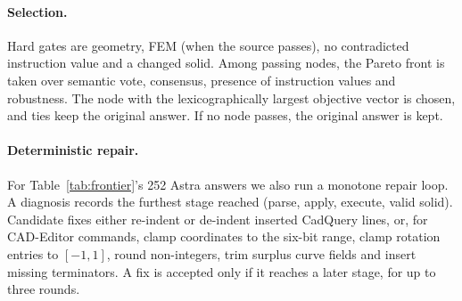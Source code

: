 \paragraph{Selection.}
Hard gates are geometry, FEM (when the source passes), no contradicted instruction value and a changed solid. Among passing nodes, the Pareto front is taken over semantic vote, consensus, presence of instruction values and robustness. The node with the lexicographically largest objective vector is chosen, and ties keep the original answer. If no node passes, the original answer is kept.

\paragraph{Deterministic repair.}
For Table~\ref{tab:frontier}'s 252 Astra answers we also run a monotone repair loop. A diagnosis records the furthest stage reached (parse, apply, execute, valid solid). Candidate fixes either re-indent or de-indent inserted CadQuery lines, or, for CAD-Editor commands, clamp coordinates to the six-bit range, clamp rotation entries to $[-1,1]$, round non-integers, trim surplus curve fields and insert missing terminators. A fix is accepted only if it reaches a later stage, for up to three rounds.




